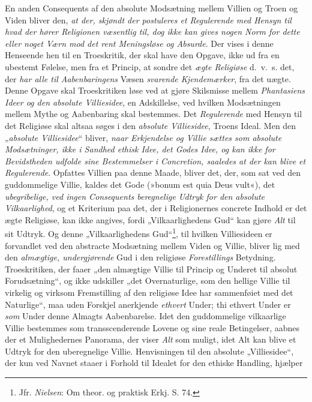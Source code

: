 \documentclass[12pt,a4paper]{book}
\newcommand{\opage}[1]{\marginnote{\footnotesize\textit{[#1]}}}
\begin{document}
En anden Consequents af den absolute Modsætning mellem Villien og Troen og Viden bliver den, \emph{at der, skjøndt der postuleres et Regulerende med Hensyn til hvad der hører Religionen
væsentlig til, dog ikke kan gives nogen Norm for dette eller noget Værn mod det rent Meningsløse
og Absurde}. Der vises i denne Henseende hen til en Troeskritik, der skal have den Opgave, ikke
ud fra en ubestemt Følelse, men fra et Princip, at sondre det \emph{ægte Religiøse} d.\ v.\ s.
det, der \emph{har alle til Aabenbaringens} Væsen \emph{svarende Kjendemærker}, fra det uægte. Denne Opgave
skal Troeskritiken løse ved at gjøre Skilsmisse mellem \emph{Phantasiens Ideer og den absolute
Villiesidee}, en Adskillelse, ved hvilken Modsætningen mellem Mythe og Aabenbaring skal
bestemmes. Det \emph{Regulerende} med Hensyn til det Religiøse skal altsaa søges i den \emph{absolute
Villiesidee}, Troens Ideal. Men den „\emph{absolute Villiesidee}“ bliver, \emph{naar Erkjendelse og
Villie sættes som absolute Modsætninger, ikke i Sandhed ethisk Idee, det Godes Idee, og kan ikke
for Bevidstheden udfolde sine Bestemmelser i Concretion, saaledes at der kan blive et
Regulerende}. Opfattes Villien paa denne Maade, bliver det, der, som sat ved den guddommelige
Villie, kaldes det Gode (»bonum est quia Deus vult«), det \emph{ubegribelige, ved ingen
Consequents beregnelige Udtryk for den absolute Vilkaarlighed}, og et Kriterium paa det, der i
Religionernes concrete Indhold er det ægte Religiøse, kan ikke angives, fordi „Vilkaarlighedens
Gud“ kan gjøre \emph{Alt} til sit Udtryk. \opage{201}Og denne „Vilkaarlighedens Gud“\footnote{Jfr. \emph{Nielsen}: Om theor. og praktisk Erkj. S. 74.}, til hvilken Villiesideen er forvandlet ved den abstracte
Modsætning mellem Viden og Villie, bliver lig med den \emph{almægtige, undergjørende} Gud i den religiøse \emph{Forestillings} Betydning. Troeskritiken, der faaer „den almægtige Villie til Princip og
Underet til absolut Forudsætning“, og ikke udskiller „det Overnaturlige, som den hellige Villie
til virkelig og virksom Fremstilling af den religiøse Idee har sammenføiet med det Naturlige“,
maa uden Forskjel anerkjende \emph{ethvert} Under; thi ethvert Under er \emph{som} Under denne
Almagts Aabenbarelse. Idet den guddommelige vilkaarlige Villie bestemmes som transscenderende
Lovene og sine reale Betingelser, aabnes der et Mulighedernes Panorama, der viser \emph{Alt} som
muligt, idet Alt kan blive et Udtryk for den uberegnelige Villie. Henvisningen til den absolute
„Villiesidee“, der kun ved Navnet staaer i Forhold til Idealet for den ethiske Handling, hjælper
\end{document}
